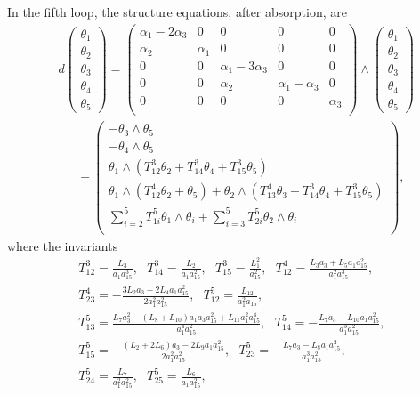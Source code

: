 \documentclass[12pt]{article}
\begin{document}
In the fifth loop, the structure equations, after absorption, are
\begin{equation}
\begin{aligned}
&d\begin{pmatrix}
\theta_1\\
\theta_2\\
\theta_3\\
\theta_4\\
\theta_5
\end{pmatrix}
=\begin{pmatrix}
\alpha_1-2\alpha_3&0&0&0&0\\
\alpha_2&\alpha_1&0&0&0\\
0&0&\alpha_1-3\alpha_3&0&0\\
0&0&\alpha_{2}&\alpha_1-\alpha_3&0\\
0&0&0&0&\alpha_3\\
\end{pmatrix}\wedge
\begin{pmatrix}
\theta_1\\
\theta_2\\
\theta_3\\
\theta_4\\
\theta_5
\end{pmatrix}\\
&~~~~~~~+\begin{pmatrix}
-\theta_3\wedge\theta_5\\
-\theta_4\wedge\theta_5\\
\theta_1\wedge(T^3_{12}\theta_2+T^3_{14}\theta_4+T^3_{15}\theta_5)\\
\theta_1\wedge(T^4_{12}\theta_2+\theta_5)+\theta_2\wedge(T^4_{13}\theta_3+T^3_{14}\theta_4+T^3_{15}\theta_5)\\
\sum^5_{i=2}T^5_{1i}\theta_1\wedge\theta_i+\sum^5_{i=3}T^5_{2i}\theta_2\wedge\theta_i\\
\end{pmatrix},
\end{aligned}
\end{equation}
where the invariants 
\begin{equation}
\begin{aligned}
&T^3_{12}=\frac{L_3}{a_1a_{15}^3},~~~
T^3_{14}=\frac{L_2}{a_1a_{15}^2},~~~T^3_{15}=\frac{L_1^2}{a_{15}^2},~~~T^4_{12}=\frac{L_3a_3+L_5a_1a_{15}^2}{a_1^2a_{15}^3},\\
&T^4_{23}=-\frac{3L_2a_3-2L_4a_1a_{15}^2}{2a_1^2a_{15}^2},~~~T^5_{12}=\frac{L_{12}}{a_1^2a_{15}},~~~\\
&T^5_{13}=\frac{L_7a_3^2-(L_8+L_{10})a_1a_3a_{15}^2+L_{11}a_1^2a_{15}^4}{a_1^4a_{15}^2},~~~T^5_{14}=-\frac{L_7a_3-L_{10}a_1a_{15}^2}{a_1^3a_{15}^2},~~~\\
&T^5_{15}=-\frac{(L_2+2L_6)a_3-2L_9a_1a_{15}^2}{2a_1^2a_{15}^2},~~~T^5_{23}=-\frac{L_7a_3-L_8a_1a_{15}^2}{a_1^3a_{15}^2},\\
&T^5_{24}=\frac{L_{7}}{a_1^2a_{15}^2},~~~T^5_{25}=\frac{L_{6}}{a_1a_{15}^2},
\end{aligned}
\end{equation}
\end{document}
